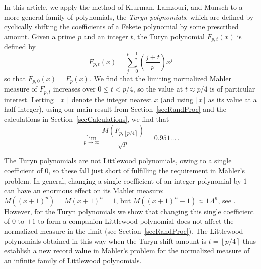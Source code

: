 \documentclass[reqno]{amsart}
\numberwithin{equation}{section}
\numberwithin{table}{section}
\numberwithin{figure}{section}
\newcommand{\floor}[1]{\lfloor#1\rfloor}
\newcommand{\leg}[2]{\left(\frac{#1}{#2}\right)}
\newcommand{\round}[1]{\left\lfloor#1\right\rceil}
\begin{document}
In this article, we apply the method of Klurman, Lamzouri, and Munsch to a more general family of polynomials, the \textit{Turyn polynomials}, which are defined by cyclically shifting the coefficients of a Fekete polynomial by some prescribed amount.
Given a prime $p$ and an integer $t$, the Turyn polynomial $F_{p,t}(x)$ is defined by
\[
F_{p,t}(x) = \sum_{j=0}^{p-1} \leg{j + t}{p} x^j
\]
so that $F_{p,0}(x) = F_p(x)$.
We find that the limiting normalized Mahler measure of $F_{p,t}$ increases over $0\leq t < p/4$, so the value at $t\approx p/4$ is of particular interest.
Letting $\round{x}$ denote the integer nearest $x$ (and using $\floor{x}$ as its value at a half-integer), using our main result from Section~\ref{secRandProc} and the calculations in Section~\ref{secCalculations}, we find that
\begin{equation}\label{eqnTurynMeas}
\lim_{p\to\infty} \frac{M(F_{p,\round{p/4}})}{\sqrt{p}} = 0.951\ldots\,.
\end{equation}

The Turyn polynomials are not Littlewood polynomials, owing to a single coefficient of $0$, so these fall just short of fulfilling the requirement in Mahler's problem.
In general, changing a single coefficient of an integer polynomial by $1$ can have an enormous effect on its Mahler measure: $M((x+1)^n) = M(x+1)^n = 1$, but $M((x+1)^n-1) \approx 1.4^n$, see \cite{Pritsker08}.
However, for the Turyn polynomials we show that changing this single coefficient of $0$ to $\pm1$ to form a companion Littlewood polynomial does not affect the normalized measure in the limit (see Section~\ref{secRandProc}).
The Littlewood polynomials obtained in this way when the Turyn shift amount is $t=\round{p/4}$ thus establish a new record value in Mahler's problem for the normalized measure of an infinite family of Littlewood polynomials.
\end{document}
